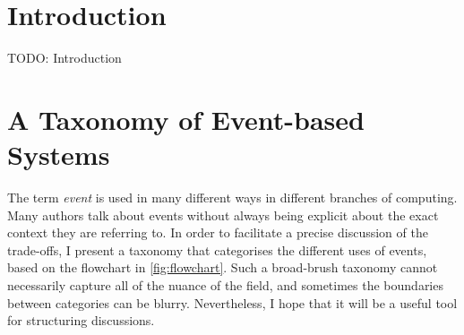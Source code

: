 \documentclass[sigconf,nonacm]{acmart}
\begin{document}

\section{Introduction}

TODO: Introduction

\section{A Taxonomy of Event-based Systems}\label{sec:taxonomy}

The term \emph{event} is used in many different ways in different branches of computing.
Many authors talk about events without always being explicit about the exact context they are referring to.
In order to facilitate a precise discussion of the trade-offs, I present a taxonomy that categorises the different uses of events, based on the flowchart in \autoref{fig:flowchart}.
Such a broad-brush taxonomy cannot necessarily capture all of the nuance of the field, and sometimes the boundaries between categories can be blurry.
Nevertheless, I hope that it will be a useful tool for structuring discussions.
\end{document}
